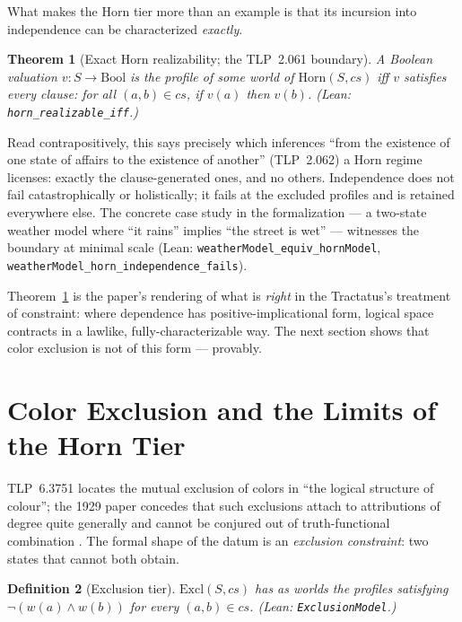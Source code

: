 \documentclass[10pt, letterpaper]{article}
\newtheorem{theorem}{Theorem}[section]
\newtheorem{definition}[theorem]{Definition}
\theoremstyle{remark}
\newcommand{\lean}[1]{\texttt{#1}}
\newcommand{\TLP}[1]{TLP~#1}
\begin{document}
What makes the Horn tier more than an example is that its incursion into
independence can be characterized \emph{exactly}.

\begin{theorem}[Exact Horn realizability; the \TLP{2.061} boundary]
\label{thm:horn-boundary}
A Boolean valuation $v : S \to \mathrm{Bool}$ is the profile of some world of
$\mathrm{Horn}(S, \mathit{cs})$ iff $v$ satisfies every clause: for all
$(a, b) \in \mathit{cs}$, if $v(a)$ then $v(b)$. (Lean:
\lean{horn\_realizable\_iff}.)
\end{theorem}

Read contrapositively, this says precisely which inferences ``from the
existence of one state of affairs to the existence of another''
(\TLP{2.062}) a Horn regime licenses: exactly the clause-generated ones, and
no others. Independence does not fail catastrophically or holistically; it
fails at the excluded profiles and is retained everywhere else. The
concrete case study in the formalization --- a two-state weather model where
``it rains'' implies ``the street is wet'' --- witnesses the boundary at
minimal scale (Lean: \lean{weatherModel\_equiv\_hornModel},
\lean{weatherModel\_horn\_independence\_fails}).

Theorem~\ref{thm:horn-boundary} is the paper's rendering of what is
\emph{right} in the Tractatus's treatment of constraint: where dependence has
positive-implicational form, logical space contracts in a lawlike,
fully-characterizable way. The next section shows that color exclusion is
not of this form --- provably.

\section{Color Exclusion and the Limits of the Horn Tier}
\label{sec:exclusion}

\TLP{6.3751} locates the mutual exclusion of colors in ``the logical
structure of colour''; the 1929 paper concedes that such exclusions attach to
attributions of degree quite generally and cannot be conjured out of
truth-functional combination \cite{wittgenstein1929}. The formal shape of the
datum is an \emph{exclusion constraint}: two states that cannot both obtain.

\begin{definition}[Exclusion tier]\label{def:exclusion}
$\mathrm{Excl}(S, \mathit{cs})$ has as worlds the profiles satisfying
$\neg(w(a) \wedge w(b))$ for every $(a, b) \in \mathit{cs}$. (Lean:
\lean{ExclusionModel}.)
\end{definition}
\end{document}
